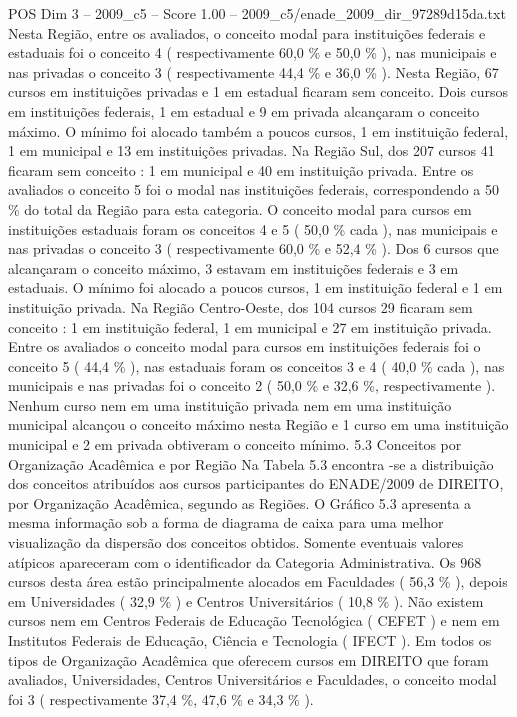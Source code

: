 \begin{textsample}{POS Dim 3 – 2009\_c5 – Score 1.00 – 2009\_c5/enade\_2009\_dir\_97289d15da.txt}
Nesta Região, entre os avaliados, o conceito modal para instituições federais e estaduais foi o conceito 4 ( respectivamente 60,0 \% e 50,0 \% ), nas municipais e nas privadas o conceito 3 ( respectivamente 44,4 \% e 36,0 \% ).
Nesta Região, 67 cursos em instituições privadas e 1 em estadual ficaram sem conceito.
Dois cursos em instituições federais, 1 em estadual e 9 em privada alcançaram o conceito máximo.
O mínimo foi alocado também a poucos cursos, 1 em instituição federal, 1 em municipal e 13 em instituições privadas.
Na Região Sul, dos 207 cursos 41 ficaram sem conceito : 1 em municipal e 40 em instituição privada.
Entre os avaliados o conceito 5 foi o modal nas instituições federais, correspondendo a 50 \% do total da Região para esta categoria.
O conceito modal para cursos em instituições estaduais foram os conceitos 4 e 5 ( 50,0 \% cada ), nas municipais e nas privadas o conceito 3 ( respectivamente 60,0 \% e 52,4 \% ).
Dos 6 cursos que alcançaram o conceito máximo, 3 estavam em instituições federais e 3 em estaduais.
O mínimo foi alocado a poucos cursos, 1 em instituição federal e 1 em instituição privada.
Na Região Centro-Oeste, dos 104 cursos 29 ficaram sem conceito : 1 em instituição federal, 1 em municipal e 27 em instituição privada.
Entre os avaliados o conceito modal para cursos em instituições federais foi o conceito 5 ( 44,4 \% ), nas estaduais foram os conceitos 3 e 4 ( 40,0 \% cada ), nas municipais e nas privadas foi o conceito 2 ( 50,0 \% e 32,6 \%, respectivamente ).
Nenhum curso nem em uma instituição privada nem em uma instituição municipal alcançou o conceito máximo nesta Região e 1 curso em uma instituição municipal e 2 em privada obtiveram o conceito mínimo. 5.3 Conceitos por Organização Acadêmica e por Região Na Tabela 5.3 encontra -se a distribuição dos conceitos atribuídos aos cursos participantes do ENADE/2009 de DIREITO, por Organização Acadêmica, segundo as Regiões.
O Gráfico 5.3 apresenta a mesma informação sob a forma de diagrama de caixa para uma melhor visualização da dispersão dos conceitos obtidos.
Somente eventuais valores atípicos apareceram com o identificador da Categoria Administrativa.
Os 968 cursos desta área estão principalmente alocados em Faculdades ( 56,3 \% ), depois em Universidades ( 32,9 \% ) e Centros Universitários ( 10,8 \% ).
Não existem cursos nem em Centros Federais de Educação Tecnológica ( CEFET ) e nem em Institutos Federais de Educação, Ciência e Tecnologia ( IFECT ).
Em todos os tipos de Organização Acadêmica que oferecem cursos em DIREITO que foram avaliados, Universidades, Centros Universitários e Faculdades, o conceito modal foi 3 ( respectivamente 37,4 \%, 47,6 \% e 34,3 \% ).

\end{textsample}
